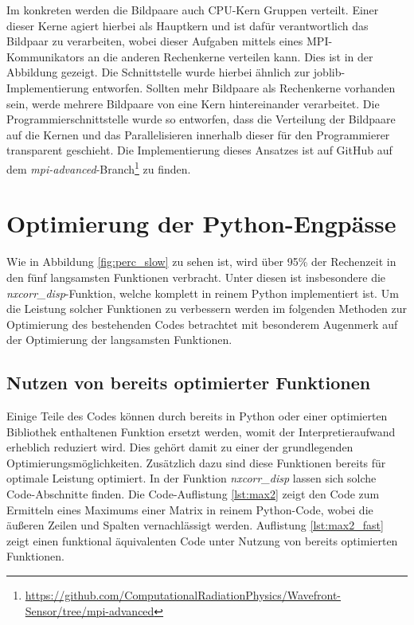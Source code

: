 Im konkreten werden die Bildpaare auch \gls{CPU}-Kern Gruppen verteilt. Einer dieser Kerne agiert hierbei als Hauptkern und ist dafür verantwortlich das Bildpaar zu verarbeiten, wobei dieser Aufgaben mittels eines \gls{MPI}-Kommunikators an die anderen Rechenkerne verteilen kann. Dies ist in der Abbildung  gezeigt. Die Schnittstelle wurde hierbei ähnlich zur joblib-Implementierung entworfen. Sollten mehr Bildpaare als Rechenkerne vorhanden sein, werde mehrere Bildpaare von eine Kern hintereinander verarbeitet. Die Programmierschnittstelle wurde so entworfen, dass die Verteilung der Bildpaare auf die Kernen und das Parallelisieren innerhalb dieser für den Programmierer transparent geschieht. Die Implementierung dieses Ansatzes ist auf GitHub auf dem \textit{mpi-advanced}-Branch\footnote{\url{https://github.com/ComputationalRadiationPhysics/Wavefront-Sensor/tree/mpi-advanced}} zu finden.


\section{Optimierung der Python-Engpässe}

Wie in Abbildung \ref{fig:perc_slow} zu sehen ist, wird über 95\% der Rechenzeit in den fünf langsamsten Funktionen verbracht. Unter diesen ist insbesondere die \textit{nxcorr\_disp}-Funktion, welche komplett in reinem Python implementiert ist. Um die Leistung solcher Funktionen zu verbessern werden im folgenden Methoden zur Optimierung des bestehenden Codes betrachtet mit besonderem Augenmerk auf der Optimierung der langsamsten Funktionen. 

\subsection{Nutzen von bereits optimierter Funktionen}

Einige Teile des Codes können durch bereits in Python oder einer optimierten Bibliothek enthaltenen Funktion ersetzt werden, womit der Interpretieraufwand erheblich reduziert wird. Dies gehört damit zu einer der grundlegenden Optimierungsmöglichkeiten. Zusätzlich dazu sind diese Funktionen bereits für optimale Leistung optimiert. In der Funktion \textit{nxcorr\_disp} lassen sich solche Code-Abschnitte finden. Die Code-Auflistung \ref{lst:max2} zeigt den Code zum Ermitteln eines Maximums einer Matrix in reinem Python-Code, wobei die äußeren Zeilen und Spalten vernachlässigt werden. Auflistung \ref{lst:max2_fast} zeigt einen funktional äquivalenten Code unter Nutzung von bereits optimierten Funktionen. 

